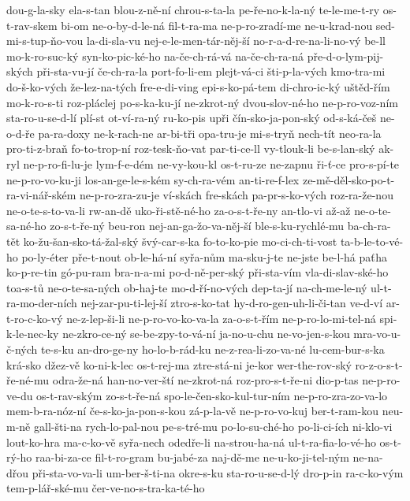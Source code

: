 {dou-g-la-sky
ela-s-tan
blou-z-ně-ní
chrou-s-ta-la
pe-ře-no-k-la-ný
te-le-me-t-ry
os-t-rav-skem
bi-om
ne-o-by-d-le-ná
fil-t-ra-ma
ne-p-ro-zradí-me
ne-u-krad-nou
sed-mi-s-tup-ňo-vou
la-di-sla-vu
nej-e-le-men-tár-něj-ší
no-r-a-d-re-na-li-no-vý
be-ll
mo-k-ro-suc-ký
syn-ko-pic-ké-ho
na-če-ch-rá-vá
na-če-ch-ra-ná
pře-d-o-lym-pij-ských
při-sta-vu-jí
če-ch-ra-la
port-fo-li-em
plejt-vá-ci
šti-p-la-vých
kmo-tra-mi
do-š-ko-vých
že-lez-na-tých
fre-e-di-ving
epi-s-ko-pá-tem
di-chro-ic-ký
uštěd-řím
mo-k-ro-s-ti
roz-pláclej
po-s-ka-ku-jí
ne-zkrot-ný
dvou-slov-né-ho
ne-p-ro-voz-ním
sta-ro-u-se-d-lí
plí-st
ot-ví-ra-ný
ru-ko-pis
upři
čín-sko-ja-pon-ský
od-s-ká-češ
ne-o-d-ře
pa-ra-doxy
ne-k-rach-ne
ar-bi-tři
opa-tru-je
mi-s-tryň
nech-tít
neo-ra-la
pro-ti-z-braň
fo-to-trop-ní
roz-tesk-ňo-vat
par-ti-ce-ll
vy-tlouk-li
be-s-lan-ský
ak-ryl
ne-p-ro-fi-lu-je
lym-f-e-dém
ne-vy-kou-kl
os-t-ru-ze
ne-zapnu
ři-ť-ce
pro-s-pí-te
ne-p-ro-vo-ku-ji
los-an-ge-le-s-kém
sy-ch-ra-vém
an-ti-re-f-lex
ze-mě-děl-sko-po-t-ra-vi-nář-ském
ne-p-ro-zra-zu-je
ví-skách
fre-skách
pa-pr-s-ko-vých
roz-ra-že-nou
ne-o-te-s-to-va-li
rw-an-dě
uko-ři-stě-né-ho
za-o-s-t-ře-ny
an-tlo-vi
až-až
ne-o-te-sa-né-ho
zo-s-t-ře-ný
beu-ron
nej-an-ga-žo-va-něj-ší
ble-s-ku-rychlé-mu
ba-ch-ra-tět
ko-žu-šan-sko-tá-žal-ský
švý-car-s-ka
fo-to-ko-pie
mo-ci-ch-ti-vost
ta-b-le-to-vé-ho
po-ly-éter
pře-t-nout
ob-le-há-ní
syřa-nům
ma-sku-j-te
ne-jste
be-l-há
paťha
ko-p-re-tin
gó-pu-ram
bra-n-a-mi
po-d-ně-per-ský
při-sta-vím
vla-di-slav-ské-ho
toa-s-tů
ne-o-te-sa-ných
ob-haj-te
mo-d-ří-no-vých
dep-ta-jí
na-ch-me-le-ný
ul-t-ra-mo-der-ních
nej-zar-pu-ti-lej-ší
ztro-s-ko-tat
hy-d-ro-gen-uh-li-či-tan
ve-d-ví
ar-t-ro-c-ko-vý
ne-z-lep-ši-li
ne-p-ro-vo-ko-va-la
za-o-s-t-řím
ne-p-ro-lo-mi-tel-ná
spi-k-le-nec-ky
ne-zkro-ce-ný
se-be-zpy-to-vá-ní
ja-no-u-chu
ne-vo-jen-s-kou
mra-vo-u-č-ných
te-s-ku
an-dro-ge-ny
ho-lo-b-rád-ku
ne-z-rea-li-zo-va-né
lu-cem-bur-s-ka
krá-sko
džez-vě
ko-ni-k-lec
os-t-rej-ma
ztre-stá-ni
je-kor
wer-the-rov-ský
ro-z-o-s-t-ře-né-mu
odra-že-ná
han-no-ver-ští
ne-zkrot-ná
roz-pro-s-t-ře-ni
dio-p-tas
ne-p-ro-ve-du
os-t-rav-ským
zo-s-t-ře-ná
spo-le-čen-sko-kul-tur-ním
ne-p-ro-zra-zo-va-lo
mem-b-ra-nóz-ní
če-s-ko-ja-pon-s-kou
zá-p-la-vě
ne-p-ro-vo-kuj
ber-t-ram-kou
neu-m-ně
gall-šti-na
rych-lo-pal-nou
pe-s-tré-mu
po-lo-su-ché-ho
po-li-ci-ích
ni-klo-vi
lout-ko-hra
ma-c-ko-vě
syřa-nech
odedře-li
na-strou-ha-ná
ul-t-ra-fia-lo-vé-ho
os-t-rý-ho
raa-bi-za-ce
fil-t-ro-gram
bu-jabé-za
naj-dě-me
ne-u-ko-ji-tel-ným
ne-na-dřou
při-sta-vo-va-li
um-ber-š-ti-na
okre-s-ku
sta-ro-u-se-d-lý
dro-p-in
ra-c-ko-vým
tem-p-lář-ské-mu
čer-ve-no-s-tra-ka-té-ho
}
